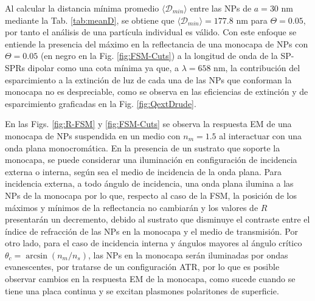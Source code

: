 Al calcular la distancia mínima promedio $\langle\mathscr{D}_{min}\rangle$ entre las NPs  de $a = 30$ nm mediante la Tab. \ref{tab:meanD}, se obtiene que $\langle\mathscr{D}_{min}\rangle  = 177.8$ nm para $\Theta = 0.05$, por tanto el análisis de una partícula individual es válido. Con este enfoque se entiende la presencia del máximo en la reflectancia de una monocapa  de NPs con $\Theta=0.05$ (en negro en la Fig. \ref{fig:FSM-Cuts}) a la longitud de onda de la SP-SPRs dipolar como una cota mínima ya que, a $\lambda=658$ nm, la contribución del esparcimiento a la extinción de luz de cada una de las NPs que conforman la monocapa no es despreciable, como se observa en las eficiencias de extinción y de esparcimiento graficadas en la Fig. \ref{fig:QextDrude}.

En las Figs. \ref{fig:R-FSM} y \ref{fig:FSM-Cuts} se observa la respuesta EM de una monocapa de NPs suspendida en un medio con $n_m=1.5$ al interactuar con una onda plana monocromática. En la presencia de un sustrato que soporte la monocapa, se puede considerar una iluminación en configuración de incidencia externa o interna, seg\'un sea el medio de incidencia de la onda plana. Para incidencia externa, a todo ángulo de incidencia,  una onda plana ilumina a las NPs de la monocapa por lo que, respecto al caso de la FSM, la posición de los máximos y mínimos de la reflectancia no cambiarán y los valores de $R$ presentarán un decremento, debido al sustrato que disminuye el contraste entre el índice de refracción de las NPs en la monocapa y el medio de transmisión. Por otro lado, para el caso de incidencia interna y ángulos mayores al ángulo crítico $\theta_c = \arcsin(n_m/n_s)$, las NPs en la monocapa serán iluminadas por ondas evanescentes, por tratarse de un configuración ATR, por lo que es posible  observar cambios en la respuesta EM de la monocapa, como sucede  cuando se tiene una placa continua y se excitan plasmones polaritones de superficie.

